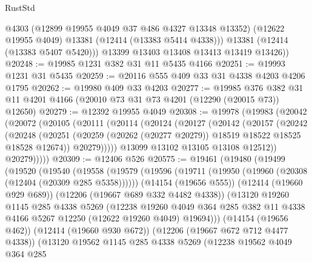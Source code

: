 \begin{lexlean}{RustStd}
\begin{coremodule}
{\begin{coremodule}
{{{{{{{{{{{{{{{{{{{{{{{{{{{{{{{{{{{{{{{{{{{{{{{{{{            @4303
            (@12899 @19955 @4049 @37 @486 @4327 @13348 @13352)
            (@12622 @19955 @4049)
            @13381
            (@12414 (@13383 @5414 @4338)))
          @13381
          (@12414 (@13383 @5407 @5420)))
        @13399
        @13403
        @13408
        @13413
        @13419
        @13426))
@20248 := @19985 @1231 @382 @31 @11 @5435 @4166
@20251 := @19993 @1231 @31 @5435
@20259 := @20116 @555 @409 @33 @31 @4338 @4203 @4206 @1795
@20262 := @19980 @409 @33 @4203
@20277 := @19985
    @376
    @382
    @31
    @11
    @4201
    @4166
    (@20010 @73 @31 @73 @4201 (@12290 (@20015 @73)) @12650)
@20279 := @12392 @19955 @4049
@20308 := @19978
    (@19983
      (@20042
        (@20072
          (@20105
            (@20111
              (@20114
                (@20124
                  (@20127
                    (@20142
                      (@20157
                        (@20242
                          (@20248
                            (@20251
                              (@20259 (@20262 (@20277 @20279)) @18519 @18522 @18525 @18528 @12674))
                            @20279)))))
                  @13099
                  @13102
                  @13105
                  @13108
                  @12512))
              @20279)))))
@20309 := @12406 @526
@20575 := @19461
    (@19480
      (@19499
        (@19520
          (@19540
            (@19558
              (@19579
                (@19596
                  (@19711 (@19950 (@19960 (@20308 (@12404 (@20309 @285 @5358))))))
                  (@14154 (@19656 @555))
                  (@12414 (@19660 @929 @689))
                  (@12206 (@19667 @689 @332 @4482 @4338))
                  (@13120
                    @19260
                    @1145
                    @285
                    @4338
                    @5269
                    (@12238
                      @19260
                      @4049
                      @364
                      @285
                      @382
                      @11
                      @4338
                      @4166
                      @5267
                      @12250
                      (@12622 @19260 @4049)
                      @19694)))
                (@14154 (@19656 @462))
                (@12414 (@19660 @930 @672))
                (@12206 (@19667 @672 @712 @4477 @4338))
                (@13120
                  @19562
                  @1145
                  @285
                  @4338
                  @5269
                  (@12238
                    @19562
                    @4049
                    @364
                    @285
}}}}}}}}}}}}}}}}}}}}}}}}}}}}}}}}}}}}}}}}}}}}}}}}}}
\end{coremodule}}
\end{coremodule}
\end{lexlean}
